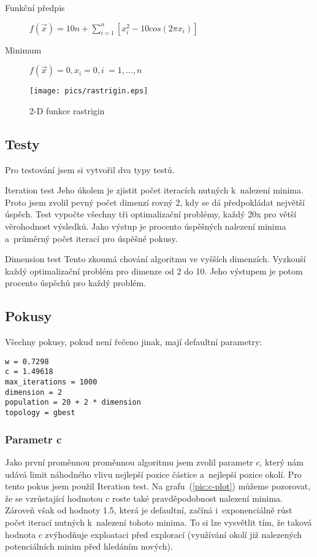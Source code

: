 \documentclass[12pt,a4paper,fleqn]{article}
\begin{document}
\begin{description}
\item[Funkční předpis] $f(\vec{x}) = 10n + \sum\limits_{i=1}^n [x_i^2 - 10 cos (2 \pi x_i)]$
\item[Minimum] $f(\vec{x}) = 0, x_i = 0, i~= 1,\dots,n$
\end{description}

\begin{figure*}[h]
\centering
\texttt{[image: pics/rastrigin.eps]}
\caption{2-D funkce rastrigin}
\end{figure*}

\subsection{Testy} \label{sec:testy}
Pro testování jsem si vytvořil dva typy testů.
\begin{description}
\item{Iteration test} Jeho úkolem je zjistit počet iteracích nutných k~nalezení minima. Proto jsem zvolil pevný počet dimenzí rovný 2, kdy se dá předpokládat největší úspěch. Test vypočte všechny tři optimalizační problémy, každý 20x pro větší věrohodnost výsledků. Jako výstup je procento úspěšných nalezení minima a~průměrný počet iterací pro úspěšné pokusy.
\item{Dimension test} Tento zkoumá chování algoritmu ve vyšších dimenzích. Vyzkouší každý optimalizační problém pro dimenze od 2 do 10. Jeho výstupem je potom procento úspěchů pro každý problém.
\end{description}

\subsection{Pokusy} \label{sec:pokusy}
Všechny pokusy, pokud není řečeno jinak, mají defaultní parametry:
\begin{verbatim}
w = 0.7298
c = 1.49618
max_iterations = 1000
dimension = 2
population = 20 + 2 * dimension
topology = gbest
\end{verbatim}

\subsubsection*{Parametr c}
Jako první proměnnou proměnnou algoritmu jsem zvolil parametr $c$, který nám udává limit náhodného vlivu nejlepší pozice částice a~nejlepší pozice okolí. Pro tento pokus jsem použil Iteration test. Na grafu~(\ref{pic:c-plot}) můžeme pozorovat, že se vzrůstající hodnotou $c$ roste také pravděpodobnost nalezení minima. Zároveň však od hodnoty 1.5, která je defaultní, začíná i~exponenciálně růst počet iterací nutných k~nalezení tohoto minima. To si lze vysvětlit tím, že taková hodnota $c$ zvýhodňuje exploataci před explorací (využívání okolí již nalezených potenciálních minim před hledáním nových).
\end{document}
